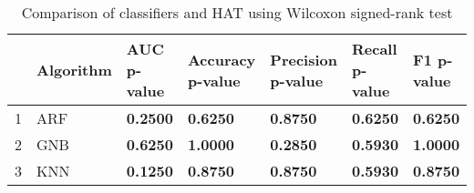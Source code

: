 \begin{table}
\footnotesize
\caption{Comparison of classifiers and HAT using Wilcoxon signed-rank test}
\label{tab:wilcoxon comparison}
\begin{tabular}{lllllll}
\hline
 & Algorithm & AUC p-value & Accuracy p-value & Precision p-value & Recall p-value & F1 p-value \\
\hline
1 & ARF & \textbf{0.2500} & \textbf{0.6250} & \textbf{0.8750} & \textbf{0.6250} & \textbf{0.6250} \\
2 & GNB & \textbf{0.6250} & \textbf{1.0000} & \textbf{0.2850} & \textbf{0.5930} & \textbf{1.0000} \\
3 & KNN & \textbf{0.1250} & \textbf{0.8750} & \textbf{0.8750} & \textbf{0.5930} & \textbf{0.8750} \\
\hline
\end{tabular}
\end{table}
